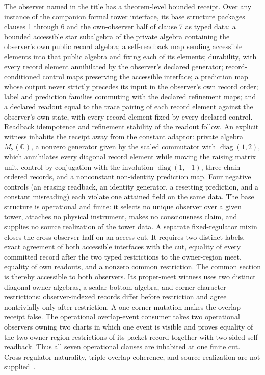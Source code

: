 \documentclass[11pt]{article}
\begin{document}
The observer named in the title has a theorem-level bounded receipt. Over any
instance of the companion formal tower interface, its base structure packages
clauses 1 through 6 and the own-observer half of clause 7 as typed data: a bounded
accessible star subalgebra of the private algebra containing the observer's
own public record algebra; a self-readback map sending accessible elements
into that public algebra and fixing each of its elements; durability, with
every record element annihilated by the observer's declared generator;
record-conditioned control maps preserving the accessible interface; a
prediction map whose output never strictly precedes its input in the
observer's own record order; label and prediction families commuting with
the declared refinement maps; and a declared readout equal to the trace
pairing of each record element against the observer's own state, with every
record element fixed by every declared control. Readback idempotence and
refinement stability of the readout follow. An explicit witness inhabits
the receipt away from the constant adaptor: private algebra
\(M_2(\mathbb C)\), a nonzero generator given by the scaled commutator with
\(\operatorname{diag}(1,2)\), which annihilates every diagonal record
element while moving the raising matrix unit, control by conjugation with
the involution \(\operatorname{diag}(1,-1)\), three chain-ordered records,
and a nonconstant non-identity prediction map. Four negative controls (an
erasing readback, an identity generator, a resetting prediction, and a
constant misreading) each violate one attained field on the same data. The
base structure is operational and
finite: it selects no unique observer over a given tower, attaches no
physical instrument, makes no consciousness claim, and supplies no source
realization of the tower data. A separate fixed-regulator mixin closes the
cross-observer half on an access cut. It requires two distinct labels, exact
agreement of both accessible interfaces with the cut, equality of every
committed record after the two typed restrictions to the owner-region meet,
equality of own readouts, and a nonzero common restriction. The common section
is thereby accessible to both observers. Its proper-meet witness uses two
distinct diagonal owner algebras, a scalar bottom algebra, and corner-character
restrictions: observer-indexed records differ before restriction and agree
nontrivially only after restriction. A one-corner mutation makes the overlap
receipt false. The operational overlap-event consumer takes two operational observers owning
two charts in which one event is visible and proves equality of the two
owner-region restrictions of its packet record together with two-sided
self-readback. Thus all seven operational clauses are inhabited at one finite
cut. Cross-regulator naturality, triple-overlap coherence, and source
realization are not supplied~\cite{ophrepo}.
\end{document}
